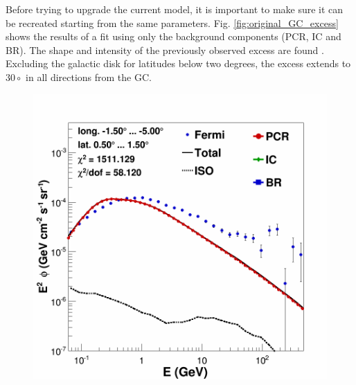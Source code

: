 Before trying to upgrade the current model, it is important to make sure it can be recreated starting from the same parameters. Fig. \ref{fig:original_GC_excess} shows the results of a fit using only the background components (PCR, IC and BR). The shape and intensity of the previously observed excess are found . Excluding the galactic disk for latitudes below two degrees, the excess extends to $30\circ$ in all directions from the GC.

\begin{figure}[h]
  \centering
  \begin{minipage}[h]{0.45\textwidth}
  	\centering
	\includegraphics[width=1.\linewidth]{pic/results/BKGonly_CMZ.png}
  	\label{fig:bkgd_only_spectrum}
  \end{minipage}
  \hfill
  \begin{minipage}[h]{0.45\textwidth}
	  \centering

\end{minipage}
\end{figure}
